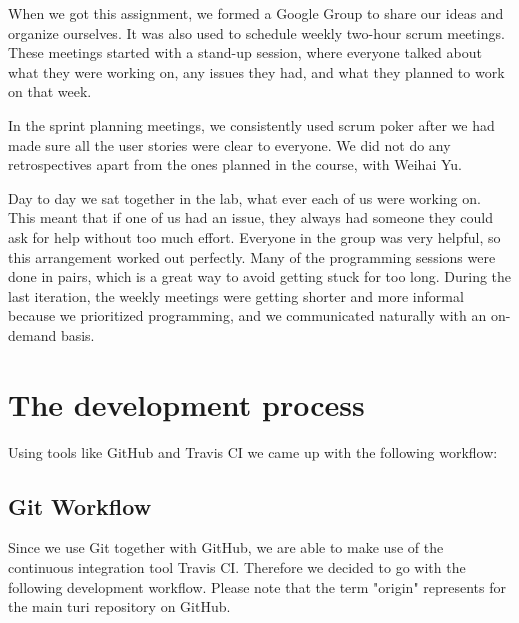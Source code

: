 \documentclass[a4paper]{article}
\begin{document}
When we got this assignment, we formed a Google Group to share our ideas and organize ourselves. It was also used to schedule weekly two-hour scrum meetings. These meetings started with a stand-up session, where everyone talked about what they were working on, any issues they had, and what they planned to work on that week.

In the sprint planning meetings, we consistently used scrum poker after we had made sure all the user stories were clear to everyone. We did not do any retrospectives apart from the ones planned in the course, with Weihai Yu.

Day to day we sat together in the lab, what ever each of us were working on. This meant that if one of us had an issue, they always had someone they could ask for help without too much effort. Everyone in the group was very helpful, so this arrangement worked out perfectly. Many of the programming sessions were done in pairs, which is a great way to avoid getting stuck for too long. During the last iteration, the weekly meetings were getting shorter and more informal because we prioritized programming, and we communicated naturally with an on-demand basis.




\section{The development process}

Using tools like GitHub and Travis CI we came up with the following workflow:

\subsection{Git Workflow}
Since we use Git together with GitHub, we are able to make use of the continuous integration tool Travis CI. Therefore we decided to go with the following development workflow. Please note that the term "origin" represents for the main turi repository on GitHub.
\end{document}
